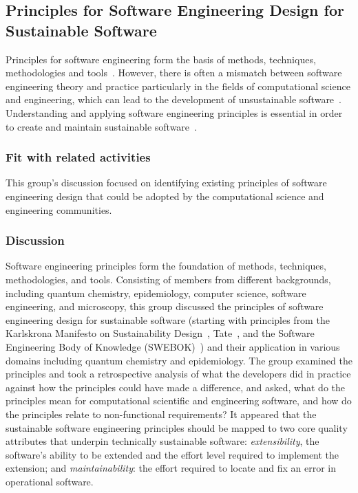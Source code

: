 \subsection{Principles for Software Engineering Design for Sustainable Software} 


Principles for software engineering form the basis of methods, techniques,
methodologies and tools~\cite{Vliet:2008}. However, there is often a mismatch
between software engineering theory and practice particularly in the fields of
computational science and engineering, which can lead to the development of
unsustainable software~\cite{Merali:2010,hettrick:2014}. Understanding and
applying software engineering principles is essential in order to create and
maintain sustainable software~\cite{Becker:2016}.

\subsubsection{Fit with related activities}

This group's discussion focused on identifying existing principles of software
engineering design that could be adopted by the computational science and
engineering communities.

\subsubsection{Discussion}

Software engineering principles form the foundation of methods, techniques,
methodologies, and tools.  Consisting of members from different
backgrounds, including quantum chemistry, epidemiology, computer science,
software engineering, and microscopy, this group discussed the principles of software
engineering design for sustainable software (starting with principles from the
Karlskrona Manifesto on Sustainability Design~\cite{Becker:2015},
Tate~\cite{tate:2005}, and the Software Engineering Body of Knowledge
(SWEBOK)~\cite{swebokv3}) and their application in various domains including
quantum chemistry and epidemiology. The group examined the principles and took a
retrospective analysis of what the developers did in practice against how the
principles could have made a difference, and asked, what do the principles mean
for computational scientific and engineering software, and how do the principles
relate to non-functional requirements? It appeared that the sustainable software
engineering principles should be mapped to two core quality attributes that
underpin technically sustainable software: \emph{extensibility}, the software's ability
to be extended and the effort level required to implement the extension; and
\emph{maintainability}: the effort required to locate and fix an error in operational
software.

